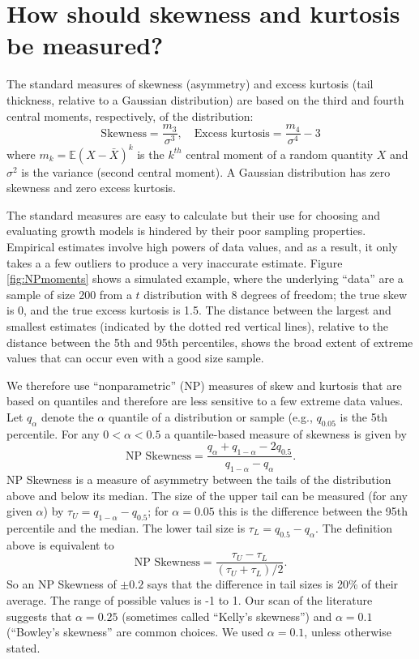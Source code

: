 \documentclass[11pt]{article}
\newcounter{box}
\newcommand{\be}{\begin{equation}}
\newcommand{\ee}{\end{equation}}
\begin{document}
{\section{How should skewness and kurtosis be measured?}
The standard measures of skewness (asymmetry) and excess kurtosis (tail thickness, relative 
to a Gaussian distribution) are based on the third and fourth central moments, respectively, of the distribution: 
\be
\mbox{Skewness} = \frac{m_3}{\sigma^3}, \quad \mbox{Excess kurtosis} = \frac{m_4}{\sigma^4}-3
\ee
where $m_k = \mathbb{E}(X - \bar{X})^k$ is the $k^{th}$ central moment of a random quantity $X$ 
and $\sigma^2$ is the variance (second central moment). A Gaussian distribution has zero skewness 
and zero excess kurtosis. 

The standard measures are easy to calculate but their use for choosing and evaluating growth models is hindered by their
poor sampling properties. Empirical estimates involve high powers of data values, and as a result, it only takes a 
a few outliers to produce a very inaccurate estimate. Figure \ref{fig:NPmoments} shows a simulated example, where the
underlying ``data'' are a sample of size 200 from a $t$ distribution with 8 degrees of freedom; the true skew is 0, and the 
true excess kurtosis is 1.5. The distance between the largest and smallest estimates (indicated by the dotted red
vertical lines), relative to the distance between the 5th and 95th percentiles, shows the broad extent of 
extreme values that can occur even with a good size sample.  

We therefore use ``nonparametric'' (NP) measures of skew and kurtosis that are based on quantiles and therefore are 
less sensitive to a few extreme data values. Let $q_\alpha$ denote the $\alpha$ quantile of a distribution or sample (e.g., $q_{0.05}$ 
is the 5th percentile. For any $0 < \alpha < 0.5$ a quantile-based measure of skewness is given by \citep{mcgillivray-1986}
\be
\mbox{NP Skewness} = \frac{q_\alpha + q_{1-\alpha} - 2 q_{0.5}}{q_{1-\alpha} - q_\alpha}.
\ee
NP Skewness is a measure of asymmetry between the tails of the distribution above and below its median. The size of the upper
tail can be measured (for any given $\alpha$) by $\tau_U = q_{1-\alpha} - q_{0.5}$; for $\alpha=0.05$ this is the difference
between the 95th percentile and the median. The lower tail size is $\tau_L = q_{0.5} - q_\alpha$. The definition above
is equivalent to  
\be
\mbox{NP Skewness} = \frac{\tau_U - \tau_L}{(\tau_U + \tau_L)/2}.
\label{eqn:NPskew}
\ee
So an NP Skewness of $\pm 0.2$ says that the difference in tail sizes is 20\% of their average. The range of possible values 
is -1 to 1. Our scan of the literature suggests that $\alpha=0.25$ (sometimes called ``Kelly's skewness'') 
and $\alpha=0.1$ (``Bowley's skewness'' are common choices. We used $\alpha=0.1$, unless otherwise stated.  
 
}
\end{document}
